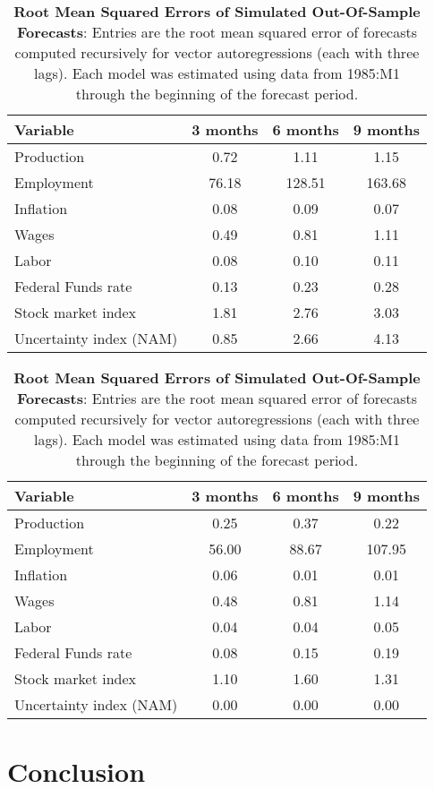 \documentclass[12pt,twoside]{reedthesis}
\begin{document}
\begin{table}

\caption[Root Mean Squared Errors of Simulated Out-Of-Sample Forecasts]{\label{tab:RMSFE-non-asset-market}\textbf{Root Mean Squared Errors of Simulated Out-Of-Sample Forecasts}: Entries are the root mean squared error of forecasts computed recursively for vector autoregressions (each with three lags). Each model was estimated using data from 1985:M1 through the beginning of the forecast period.}
\centering
\begin{tabular}[t]{lccc}
\toprule
Variable & 3 months & 6 months & 9 months\\
\midrule
Production & 0.72 & 1.11 & 1.15\\
Employment & 76.18 & 128.51 & 163.68\\
Inflation & 0.08 & 0.09 & 0.07\\
Wages & 0.49 & 0.81 & 1.11\\
Labor & 0.08 & 0.10 & 0.11\\
Federal Funds rate & 0.13 & 0.23 & 0.28\\
Stock market index & 1.81 & 2.76 & 3.03\\
Uncertainty index (NAM) & 0.85 & 2.66 & 4.13\\
\bottomrule
\end{tabular}
\end{table}

\begin{table}

\caption[Root Mean Squared Errors of Simulated Out-Of-Sample Forecasts]{\label{tab:RMSFE-non-asset-market-org}\textbf{Root Mean Squared Errors of Simulated Out-Of-Sample Forecasts}: Entries are the root mean squared error of forecasts computed recursively for vector autoregressions (each with three lags). Each model was estimated using data from 1985:M1 through the beginning of the forecast period.}
\centering
\begin{tabular}[t]{lccc}
\toprule
Variable & 3 months & 6 months & 9 months\\
\midrule
Production & 0.25 & 0.37 & 0.22\\
Employment & 56.00 & 88.67 & 107.95\\
Inflation & 0.06 & 0.01 & 0.01\\
Wages & 0.48 & 0.81 & 1.14\\
Labor & 0.04 & 0.04 & 0.05\\
Federal Funds rate & 0.08 & 0.15 & 0.19\\
Stock market index & 1.10 & 1.60 & 1.31\\
Uncertainty index (NAM) & 0.00 & 0.00 & 0.00\\
\bottomrule
\end{tabular}
\end{table}
\hypertarget{conclusion}{%
\chapter*{Conclusion}\label{conclusion}}
\end{document}
